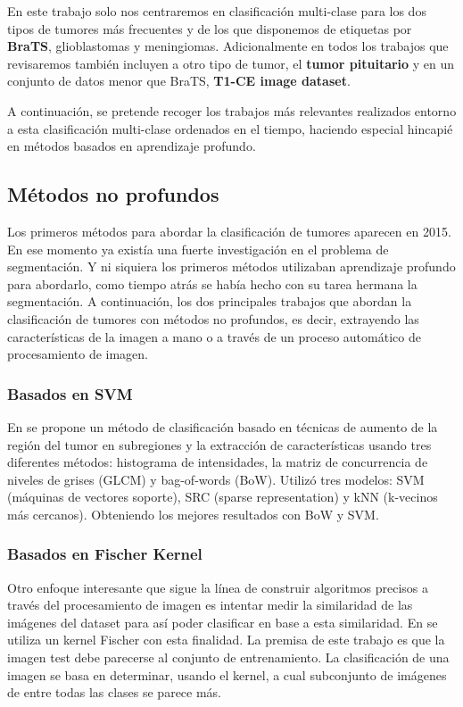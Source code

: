 En este trabajo solo nos centraremos en clasificación multi-clase para los dos tipos de tumores más frecuentes y de los que disponemos de etiquetas por \textbf{BraTS}, glioblastomas y meningiomas. Adicionalmente en todos los trabajos que revisaremos también incluyen a otro tipo de tumor, el \textbf{tumor pituitario} y en un conjunto de datos menor que BraTS, \textbf{T1-CE image dataset}. 

A continuación, se pretende recoger los trabajos más relevantes realizados entorno a esta clasificación multi-clase ordenados en el tiempo, haciendo especial hincapié en métodos basados en aprendizaje profundo. 

\subsection{Métodos no profundos}

Los primeros métodos para abordar la clasificación de tumores aparecen en 2015. En ese momento ya existía una fuerte investigación en el problema de segmentación. Y ni siquiera los primeros métodos utilizaban aprendizaje profundo para abordarlo, como tiempo atrás se había hecho con su tarea hermana la segmentación. A continuación, los dos principales trabajos que abordan la clasificación de tumores con métodos no profundos, es decir, extrayendo las características de la imagen a mano o a través de un proceso automático de procesamiento de imagen.

\subsubsection{Basados en SVM}

En \cite{cheng2015enhanced} se propone un método de clasificación basado en técnicas de aumento de la región del tumor en subregiones y la extracción de características usando tres diferentes métodos: histograma de intensidades, la matriz de concurrencia de niveles de grises (GLCM) y bag-of-words (BoW). Utilizó tres modelos: SVM (máquinas de vectores soporte), SRC (sparse representation) y kNN (k-vecinos más cercanos). Obteniendo los mejores resultados con BoW y SVM.

\subsubsection{Basados en Fischer Kernel}

Otro enfoque interesante que sigue la línea de construir algoritmos precisos a través del procesamiento de imagen es intentar medir la similaridad de las imágenes del dataset para así poder clasificar en base a esta similaridad. En \cite{cheng2016retrieval} se utiliza un kernel Fischer con esta finalidad. La premisa de este trabajo es que la imagen test debe parecerse al conjunto de entrenamiento. La clasificación de una imagen se basa en determinar, usando el kernel, a cual subconjunto de imágenes de entre todas las clases se parece más.

